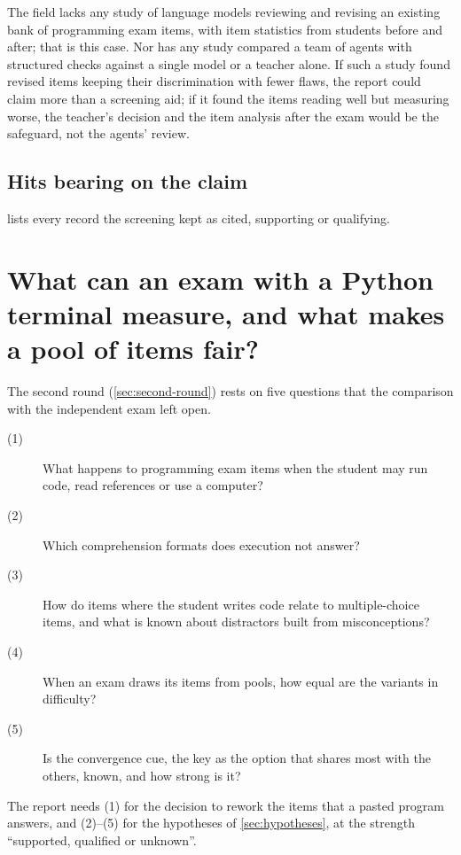 The field lacks any study of language models reviewing and revising an
existing bank of programming exam items, with item statistics from
students before and after; that is this case.  Nor has any study compared
a team of agents with structured checks against a single model or a
teacher alone.  If such a study found revised items keeping their
discrimination with fewer flaws, the report could claim more than a
screening aid; if it found the items reading well but measuring worse,
the teacher's decision and the item analysis after the exam would be the
safeguard, not the agents' review.

\section{Hits bearing on the claim}
\label{sec:llm-items-hits}

 lists every record the screening kept as cited,
supporting or qualifying.



\chapter{What can an exam with a Python terminal measure, and what makes
  a pool of items fair?}
\label{app:komplement}

The second round (\cref{sec:second-round}) rests on five questions that
the comparison with the independent exam left open.
\begin{description}
  \item[(1)] What happens to programming exam items when the student may
    run code, read references or use a computer?
  \item[(2)] Which comprehension formats does execution not answer?
  \item[(3)] How do items where the student writes code relate to
    multiple-choice items, and what is known about distractors built from
    misconceptions?
  \item[(4)] When an exam draws its items from pools, how equal are the
    variants in difficulty?
  \item[(5)] Is the convergence cue, the key as the option that shares
    most with the others, known, and how strong is it?
\end{description}
The report needs (1) for the decision to rework the items that a pasted
program answers, and (2)--(5) for the hypotheses of
\cref{sec:hypotheses}, at the strength \enquote{supported, qualified or
unknown}.

